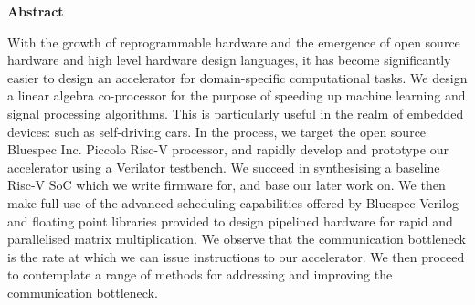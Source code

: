 \newpage
{\Huge \bf Abstract}
\vspace{24pt} 

With the growth of reprogrammable hardware and the emergence of open source hardware and high level hardware design languages, it has become significantly easier to design an accelerator for domain-specific computational tasks. We design a linear algebra co-processor for the purpose of speeding up machine learning and signal processing algorithms. This is particularly useful in the realm of embedded devices: such as self-driving cars. In the process, we target the open source Bluespec Inc. Piccolo Risc-V processor, and rapidly develop and prototype our accelerator using a Verilator testbench. We succeed in synthesising a baseline Risc-V SoC which we write firmware for, and base our later work on. We then make full use of the advanced scheduling capabilities offered by Bluespec Verilog and floating point libraries provided to design pipelined hardware for rapid and parallelised matrix multiplication. We observe that the communication bottleneck is the rate at which we can issue instructions to our accelerator. We then proceed to contemplate a range of methods for addressing and improving the communication bottleneck.
\newpage
\vspace*{\fill}
